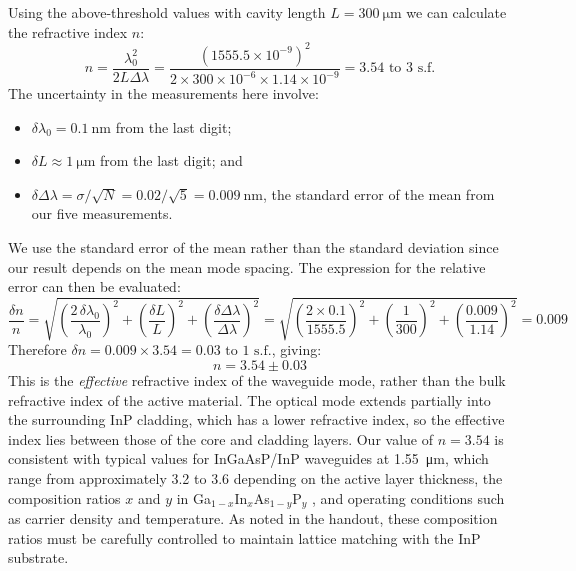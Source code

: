 \documentclass[a4paper, 10pt]{article}
\begin{document}
Using the above-threshold values with cavity length $L=\SI{300}{\micro \metre}$ we can calculate the refractive index $n$:
\begin{equation*}
    n = \frac{\lambda_0^2}{2L\Delta\lambda} = \frac{(1555.5 \times 10^{-9})^2}{2 \times 300 \times 10^{-6} \times 1.14 \times 10^{-9}} = 3.54 \text{ to 3 s.f.}
\end{equation*}
The uncertainty in the measurements here involve:
\begin{itemize}[noitemsep]
    \item $\delta\lambda_0 = \SI{0.1}{\nano\metre}$ from the last digit;
    \item $\delta L \approx \SI{1}{\micro\metre}$ from the last digit; and
    \item $\delta\Delta\lambda = \sigma / \sqrt{N} = 0.02 / \sqrt{5} = \SI{0.009}{\nano\metre}$, the standard error of the mean from our five measurements.
\end{itemize}
We use the standard error of the mean rather than the standard deviation since our result depends on the mean mode spacing. The expression for the relative error can then be evaluated:
\begin{equation*}
    \frac{\delta n}{n} = \sqrt{\left(\frac{2\,\delta\lambda_0}{\lambda_0}\right)^2 + \left(\frac{\delta L}{L}\right)^2 + \left(\frac{\delta\Delta\lambda}{\Delta\lambda}\right)^2} = \sqrt{\left(\frac{2 \times 0.1}{1555.5}\right)^2 + \left(\frac{1}{300}\right)^2 + \left(\frac{0.009}{1.14}\right)^2} = 0.009
\end{equation*}
Therefore $\delta n = 0.009 \times 3.54 = 0.03 \text{ to 1 s.f.}$, giving:
\begin{equation*}
    \boxed{n = 3.54 \pm 0.03}
\end{equation*}
This is the \textit{effective} refractive index of the waveguide mode, rather than the bulk refractive index of the active material. The optical mode extends partially into the surrounding InP cladding, which has a lower refractive index, so the effective index lies between those of the core and cladding layers. Our value of $n = 3.54$ is consistent with typical values for InGaAsP/InP waveguides at \SI{1.55}{\micro\metre}, which range from approximately 3.2 to 3.6 depending on the active layer thickness, the composition ratios $x$ and $y$ in Ga$_{1-x}$In$_x$As$_{1-y}$P$_y$ \cite{brobergRefractiveIndexIn1xGaxAsyP1y1984, bernardMidinfraredOpticalCharacterization2018}, and operating conditions such as carrier density and temperature. As noted in the handout, these composition ratios must be carefully controlled to maintain lattice matching with the InP substrate.
\end{document}
